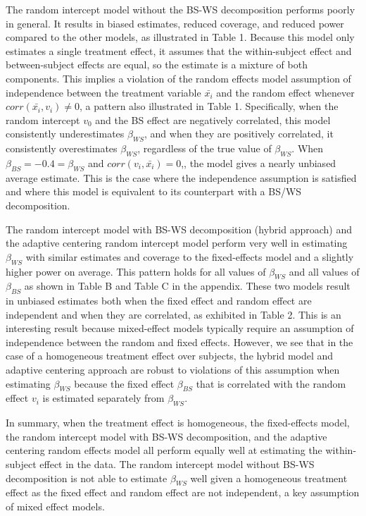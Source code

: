 \documentclass{article}
\begin{document}
        The random intercept model without the BS-WS decomposition performs poorly in general. It results in biased estimates, reduced coverage, and reduced power compared to the other models, as illustrated in Table 1. Because this model only estimates a single treatment effect, it assumes that the within-subject effect and between-subject effects are equal, so the estimate is a mixture of both components. This implies a violation of the random effects model assumption of independence between the treatment variable $\bar{x_i}$ and the random effect whenever $corr(\bar{x_i}, v_i) \neq 0$, a pattern also illustrated in Table 1. Specifically, when the random intercept $v_0$ and the BS effect are negatively correlated, this model consistently underestimates $\beta_{WS}$, and when they are positively correlated, it consistently overestimates $\beta_{WS}$, regardless of the true value of $\beta_{WS}$. When $\beta_{BS} = -0.4 = \beta_{WS}$ and $corr(v_i, \bar{x_i}) = 0$,, the model gives a nearly unbiased average estimate. This is the case where the independence assumption is satisfied and where this model is equivalent to its counterpart with a BS/WS decomposition.  

        The random intercept model with BS-WS decomposition (hybrid approach) and the adaptive centering random intercept model perform very well in estimating $\beta_{WS}$ with similar estimates and coverage to the fixed-effects model and a slightly higher power on average. This pattern holds for all values of $\beta_{WS}$ and all values of $\beta_{BS}$ as shown in Table B and Table C in the appendix. These two models result in unbiased estimates both when the fixed effect and random effect are independent and when they are correlated, as exhibited in Table 2. This is an interesting result because mixed-effect models typically require an assumption of independence between the random and fixed effects. However, we see that in the case of a homogeneous treatment effect over subjects, the hybrid model and adaptive centering approach are robust to violations of this assumption when estimating $\beta_{WS}$ because the fixed effect $\beta_{BS}$ that is correlated with the random effect $v_i$ is estimated separately from $\beta_{WS}$.

        In summary, when the treatment effect is homogeneous, the fixed-effects model, the random intercept model with BS-WS decomposition, and the adaptive centering random effects model all perform equally well at estimating the within-subject effect in the data. The random intercept model without BS-WS decomposition is not able to estimate $\beta_{WS}$ well given a homogeneous treatment effect as the fixed effect and random effect are not independent, a key assumption of mixed effect models.  
\end{document}
